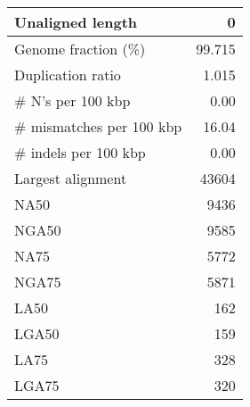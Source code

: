 \documentclass[12pt,a4paper]{article}
\begin{document}
\begin{table}[ht]
\begin{center}
\begin{tabular}{|l*{1}{|r}|}
Unaligned length & 0 \\ \hline
Genome fraction (\%) & 99.715 \\ \hline
Duplication ratio & 1.015 \\ \hline
\# N's per 100 kbp & 0.00 \\ \hline
\# mismatches per 100 kbp & 16.04 \\ \hline
\# indels per 100 kbp & 0.00 \\ \hline
Largest alignment & 43604 \\ \hline
NA50 & 9436 \\ \hline
NGA50 & 9585 \\ \hline
NA75 & 5772 \\ \hline
NGA75 & 5871 \\ \hline
LA50 & 162 \\ \hline
LGA50 & 159 \\ \hline
LA75 & 328 \\ \hline
LGA75 & 320 \\ \hline
\end{tabular}
\end{center}
\end{table}
\end{document}
